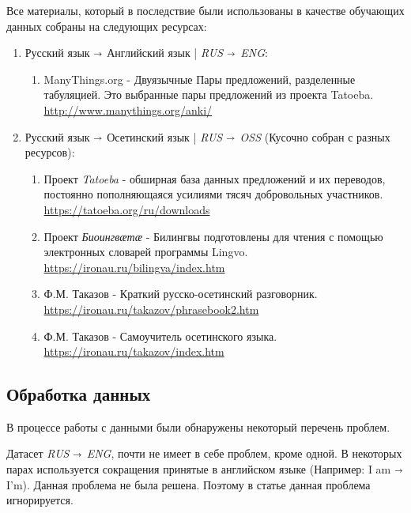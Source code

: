 \documentclass[a4paper,12pt]{article}
\begin{document}
    
    Все материалы, который в последствие были использованы в качестве обучающих данных собраны на следующих ресурсах: 
	
	\begin{enumerate}
		\item Русский язык $\shortrightarrow$ Английский язык | \textit{RUS $\shortrightarrow$ ENG}:
		\begin{enumerate}
			\item ManyThings.org - Двуязычные Пары предложений, разделенные табуляцией. 
			Это выбранные пары предложений из проекта Tatoeba. \\ 
			\url{http://www.manythings.org/anki/}
		\end{enumerate}
		\item Русский язык $\shortrightarrow$ Осетинский язык | \textit{RUS $\shortrightarrow$ OSS} (Кусочно собран с разных ресурсов):
		\begin{enumerate}
			 \item Проект \textit{Tatoeba} - обширная база данных предложений и их переводов, постоянно пополняющаяся усилиями тясяч добровольных участников. \\ \url{https://tatoeba.org/ru/downloads}
			 \item Проект \textit{Биоингвӕтӕ} - Билингвы подготовлены для чтения с помощью электронных словарей программы Lingvo. \\ \url{https://ironau.ru/bilingva/index.htm}
			 \item Ф.М. Таказов - Краткий русско-осетинский разговорник. \\ \url{https://ironau.ru/takazov/phrasebook2.htm}
			 \item Ф.М. Таказов - Самоучитель осетинского языка. \\ \url{https://ironau.ru/takazov/index.htm}
 		\end{enumerate}
	\end{enumerate}
	
	\subsection*{Обработка данных}
	
    В процессе работы с данными были обнаружены некоторый перечень проблем. 
    
    Датасет \textit{RUS $\shortrightarrow$ ENG}, почти не имеет в себе проблем, кроме одной. В некоторых парах используется сокращения принятые в английском языке (Например: I am $\shortrightarrow$ I'm). Данная проблема не была решена. Поэтому в статье данная проблема игнорируется.
    
\end{document}
